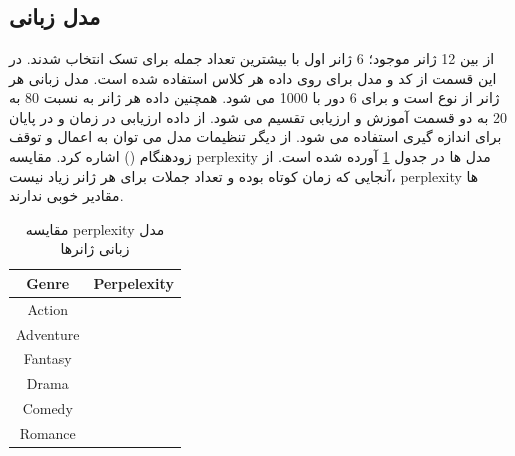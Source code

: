 \section{}

\subsection{مدل زبانی}
از بین 12 ژانر موجود؛ 6 ژانر اول با بیشترین تعداد جمله برای تسک 
انتخاب شدند. در این قسمت از کد
\cite{Ref1}
و مدل 
برای 
روی داده هر کلاس  استفاده شده است. مدل زبانی هر ژانر از نوع
است و برای 6 دور با
1000
می شود. همچنین داده هر ژانر به نسبت 80 به 20 به دو قسمت آموزش و ارزیابی تقسیم می شود. از داده ارزیابی در زمان 
و در پایان برای اندازه گیری
استفاده می شود. از دیگر تنظیمات مدل می توان به اعمال
و توقف زودهنگام () اشاره کرد. مقایسه perplexity مدل ها در جدول
\ref{tab51}
آورده شده است. از آنجایی که زمان 
کوتاه بوده و تعداد جملات برای هر ژانر زیاد نیست، perplexity ها مقادیر خوبی ندارند.


\begin{center}
	\begin{table}
		\begin{center}
		\begin{tabular}{ |c|c| }
		\hline
		\textbf{Genre} & \textbf{Perpelexity} \\ 
		\hline
		Action  & $ $ \\
		\hline
		Adventure  & $ $ \\
		\hline
		Fantasy  & $ $ \\
		\hline
		Drama & $ $ \\
		\hline
		Comedy  & $ $ \\
		\hline
		Romance  & $ $ \\
		\hline
	\end{tabular}
\caption{\label{tab51}مقایسه perplexity مدل زبانی ژانرها}
\end{center}
\end{table}
\end{center}

